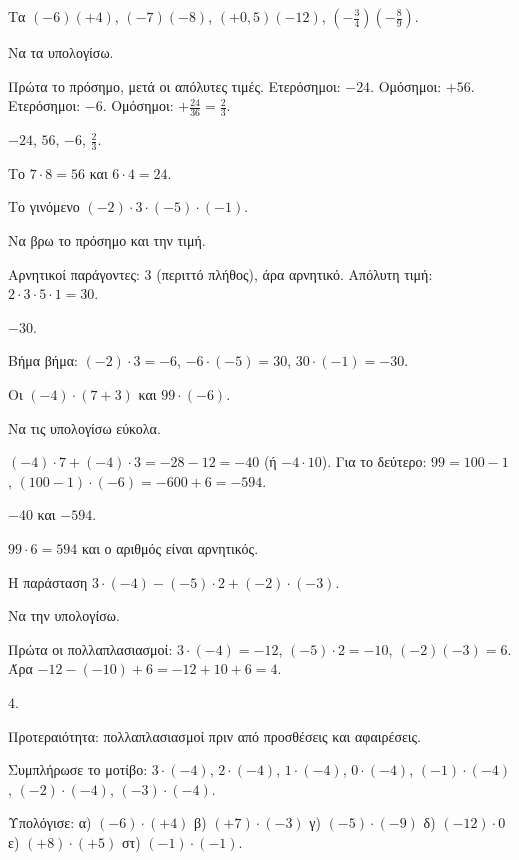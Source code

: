 \tixero Τα $(-6)(+4)$, $(-7)(-8)$, $(+0{,}5)(-12)$, $\left(-\frac{3}{4}\right)\left(-\frac{8}{9}\right)$.\par
\tithelo Να τα υπολογίσω.\par
\possindeo Πρώτα το πρόσημο, μετά οι απόλυτες τιμές. Ετερόσημοι: $-24$. Ομόσημοι: $+56$. Ετερόσημοι: $-6$. Ομόσημοι: $+\frac{24}{36}=\frac{2}{3}$.\par
\apantisi $-24$, $56$, $-6$, $\frac{2}{3}$.\par
\elegxos Το $7\cdot8=56$ και $6\cdot4=24$.

\tixero Το γινόμενο $(-2)\cdot3\cdot(-5)\cdot(-1)$.\par
\tithelo Να βρω το πρόσημο και την τιμή.\par
\possindeo Αρνητικοί παράγοντες: $3$ (περιττό πλήθος), άρα αρνητικό. Απόλυτη τιμή: $2\cdot3\cdot5\cdot1=30$.\par
\apantisi $-30$.\par
\elegxos Βήμα βήμα: $(-2)\cdot3=-6$, $-6\cdot(-5)=30$, $30\cdot(-1)=-30$.

\tixero Οι $(-4)\cdot(7+3)$ και $99\cdot(-6)$.\par
\tithelo Να τις υπολογίσω εύκολα.\par
\possindeo $(-4)\cdot7+(-4)\cdot3=-28-12=-40$ (ή $-4\cdot10$). Για το δεύτερο: $99=100-1$, $(100-1)\cdot(-6)=-600+6=-594$.\par
\apantisi $-40$ και $-594$.\par
\elegxos $99\cdot6=594$ και ο αριθμός είναι αρνητικός.

\tixero Η παράσταση $3\cdot(-4)-(-5)\cdot2+(-2)\cdot(-3)$.\par
\tithelo Να την υπολογίσω.\par
\possindeo Πρώτα οι πολλαπλασιασμοί: $3\cdot(-4)=-12$, $(-5)\cdot2=-10$, $(-2)(-3)=6$. Άρα $-12-(-10)+6=-12+10+6=4$.\par
\apantisi $4$.\par
\elegxos Προτεραιότητα: πολλαπλασιασμοί πριν από προσθέσεις και αφαιρέσεις.



\ex Συμπλήρωσε το μοτίβο: $3\cdot(-4)$, $2\cdot(-4)$, $1\cdot(-4)$, $0\cdot(-4)$, $(-1)\cdot(-4)$, $(-2)\cdot(-4)$, $(-3)\cdot(-4)$.

\ex Υπολόγισε: α) $(-6)\cdot(+4)$ \quad β) $(+7)\cdot(-3)$ \quad γ) $(-5)\cdot(-9)$ \quad δ) $(-12)\cdot0$ \quad ε) $(+8)\cdot(+5)$ \quad στ) $(-1)\cdot(-1)$.

